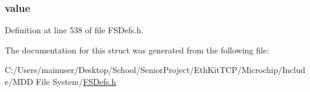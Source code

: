 \subsubsection[{value}]{ value}\label{struct_m_e_d_i_a___i_n_f_o_r_m_a_t_i_o_n_a6bcc1b836cedcc585ba2018f6cb737ff}


Definition at line 538 of file F\+S\+Defs.\+h.



The documentation for this struct was generated from the following file\+:\begin{DoxyCompactItemize}
\item 
C\+:/\+Users/mainuser/\+Desktop/\+School/\+Senior\+Project/\+Eth\+Kit\+T\+C\+P/\+Microchip/\+Include/\+M\+D\+D File System/\hyperlink{_f_s_defs_8h}{F\+S\+Defs.\+h}\end{DoxyCompactItemize}

